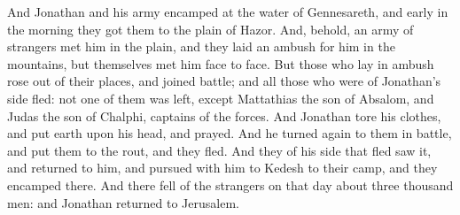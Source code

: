 {And Jonathan and his army encamped at the water of Gennesareth, and early in the morning they got them to the plain of Hazor.
And, behold, an army of strangers met him in the plain, and they laid an ambush for him in the mountains, but themselves met him face to face.
But those who lay in ambush rose out of their places, and joined battle; and all those who were of Jonathan’s side fled:
not one of them was left, except Mattathias the son of Absalom, and Judas the son of Chalphi, captains of the forces.
And Jonathan tore his clothes, and put earth upon his head, and prayed.
And he turned again to them in battle, and put them to the rout, and they fled.
And they of his side that fled saw it, and returned to him, and pursued with him to Kedesh to their camp, and they encamped there.
And there fell of the strangers on that day about three thousand men: and Jonathan returned to Jerusalem.

}
